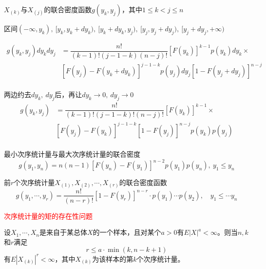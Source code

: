 $X_{(k)}$与$X_{(j)}$的联合密度函数$g(y_k,y_j)$，其中$1\leqslant k<j\leqslant n$

区间$(-\infty, y_k),\ [ y_k,y_k+dy_k ),\ [y_k+dy_k,y_j),\ [y_j,y_j+dy_j),\ [y_j+dy_j,+\infty)$

\[
    \begin{array}{ll}
        g(y_k,y_j)dy_{k}dy_{j}&=\dfrac{n!}{(k-1)!(j-1-k)(n-j)!}[F(y_k)]^{k-1}p(y_k)dy_k\times \\
        &[F(y_j)-F(y_k+dy_k)]^{j-1-k}p(y_j)dy_j[1-F(y_j+dy_j)]^{n-j}\\
    \end{array}
\]

两边约去$dy_k,\ dy_j$后，再让$dy_k\rightarrow 0,\ dy_j\rightarrow 0$
\[
    \begin{array}{ll}
        g(y_k,y_j)&=\dfrac{n!}{(k-1)!(j-1-k)!(n-j)!}[F(y_k)]^{k-1}\times \\
        &[F(y_j)-F(y_k)]^{j-1-k}[1-F(y_j)]^{n-j}p(y_k)p(y_j)\\
    \end{array}
\]

最小次序统计量与最大次序统计量的联合密度
\[
    g(y_1,y_n) = n(n-1)[F(y_n)-F(y_1)]^{n-2}p(y_1)p(y_n),\ y_1\leqslant y_n
\]

前$r$个次序统计量$X_{(1)},X_{(2)},\cdots, X_{{(r)}}$的联合密度函数
\[
    g(y_1, \cdots, y_r) = \dfrac{n!}{(n-r)!}[1-F(y_r)]^{n-r}\cdot p(y_1)\cdots p(y_2),\quad y_1\leqslant\cdots y_n
\]

\textcolor{red}{次序统计量的矩的存在性问题}

\begin{theorem}\label{them:rlea}
    设$X_1,\cdots,X_n$是来自于某总体$X$的一个样本，且对某个$a>0$有$E|X|^{a}<\infty$。则当$n,k$和$r$满足
    \[
        r\leqslant a\cdot\min(k,n-k+1)
    \]
    有$E|X_{(k)}|^{r}<\infty$，其中$X_{(k)}$为该样本的第$k$个次序统计量。
\end{theorem}

